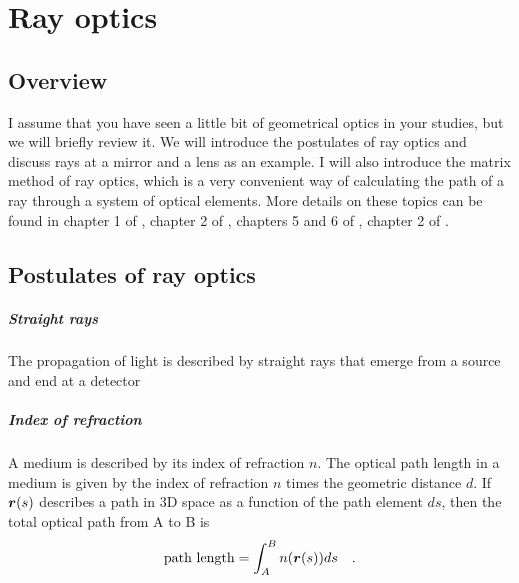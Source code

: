 \renewcommand{\lastmod}{September 22, 2023}
\renewcommand{\chapterauthors}{Markus Lippitz}

\chapter{Ray optics}






\section{Overview}

I assume that you have seen a little bit of geometrical optics in your studies, but we will briefly review it. We will introduce the postulates of ray optics and discuss rays at a mirror and a lens as an example. I will also introduce the matrix method of ray optics, which is a very convenient way of calculating the path of a ray through a system of optical elements. More details on these topics can be found in chapter 1 of \cite{SalehTeich1991}, chapter 2 of \cite{Hering_Martin_Optik},  chapters 5 and 6 of \cite{Hecht_Optics}, chapter 2 of \cite{Konijnenberg_Optics}.


\section{Postulates of ray optics}

\paragraph*{Straight rays}  The propagation of light is described by straight rays that emerge from a source and end at a detector

\paragraph*{Index of refraction} A medium is described by its index of refraction $n$. The optical path length in a medium is given by the index of refraction $n$ times the geometric distance $d$. If $\boldsymbol{r}(s)$ describes a path in 3D space as a function of the path element $ds$, then the total optical path from A to B is
\begin{equation}
    \text{path length} = \int_A^B n(\boldsymbol{r}(s)) ds \quad .
\end{equation}

